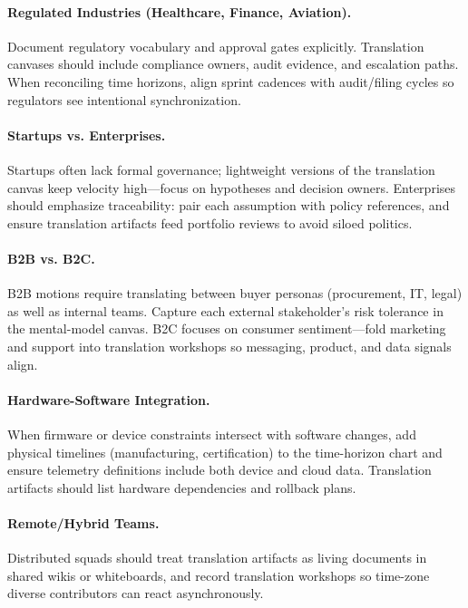 \paragraph{Regulated Industries (Healthcare, Finance, Aviation).} Document regulatory vocabulary and approval gates explicitly. Translation canvases should include compliance owners, audit evidence, and escalation paths. When reconciling time horizons, align sprint cadences with audit/filing cycles so regulators see intentional synchronization.

\paragraph{Startups vs. Enterprises.} Startups often lack formal governance; lightweight versions of the translation canvas keep velocity high—focus on hypotheses and decision owners. Enterprises should emphasize traceability: pair each assumption with policy references, and ensure translation artifacts feed portfolio reviews to avoid siloed politics.

\paragraph{B2B vs. B2C.} B2B motions require translating between buyer personas (procurement, IT, legal) as well as internal teams. Capture each external stakeholder's risk tolerance in the mental-model canvas. B2C focuses on consumer sentiment—fold marketing and support into translation workshops so messaging, product, and data signals align.

\paragraph{Hardware-Software Integration.} When firmware or device constraints intersect with software changes, add physical timelines (manufacturing, certification) to the time-horizon chart and ensure telemetry definitions include both device and cloud data. Translation artifacts should list hardware dependencies and rollback plans.

\paragraph{Remote/Hybrid Teams.} Distributed squads should treat translation artifacts as living documents in shared wikis or whiteboards, and record translation workshops so time-zone diverse contributors can react asynchronously.

